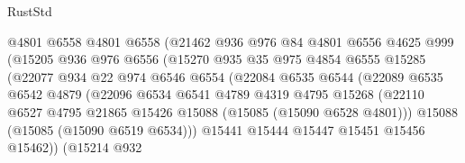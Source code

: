 \begin{lexlean}{RustStd}
\begin{coremodule}
                            @4801
                            @6558
                            @4801
                            @6558
                            (@21462
                              @936
                              @976
                              @84
                              @4801
                              @6556
                              @4625
                              @999
                              (@15205
                                @936
                                @976
                                @6556
                                (@15270
                                  @935
                                  @35
                                  @975
                                  @4854
                                  @6555
                                  @15285
                                  (@22077
                                    @934
                                    @22
                                    @974
                                    @6546
                                    @6554
                                    (@22084
                                      @6535
                                      @6544
                                      (@22089
                                        @6535
                                        @6542
                                        @4879
                                        (@22096
                                          @6534
                                          @6541
                                          @4789
                                          @4319
                                          @4795
                                          @15268
                                          (@22110
                                            @6527
                                            @4795
                                            @21865
                                            @15426
                                            @15088
                                            (@15085 (@15090 @6528 @4801)))
                                          @15088
                                          (@15085 (@15090 @6519 @6534)))
                                        @15441
                                        @15444
                                        @15447
                                        @15451
                                        @15456
                                        @15462))
                                    (@15214
                                      @932

\end{coremodule}
\end{lexlean}
